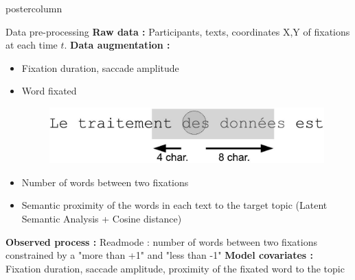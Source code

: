 \documentclass[final,hyperref={pdfpagelabels=false}]{beamer}
\begin{document}
\begin{frame}
\begin{columns}
\begin{column}{.50\textwidth}
\begin{beamercolorbox}[center,wd=\textwidth]{postercolumn}
\begin{minipage}[T]{.98\textwidth}
{            \vfill
            \begin{block}{Data pre-processing}
                \textbf{Raw data :} Participants, texts, coordinates X,Y of fixations at each time $t$.
                \vskip0.5cm
                \textbf{Data augmentation :}
                \begin{itemize}
                    \item[\bullet] Fixation duration, saccade amplitude
                    \item[\bullet]
                    \begin{minipage}{0.45\textwidth}
                        Word fixated
                    \end{minipage}
                    \begin{minipage}{0.35\textwidth}
                        \begin{figure}[H]
                            \includegraphics[width=1\linewidth]{fixation_window.jpg}
                        \end{figure}
                    \end{minipage}
                    \item[\bullet] Number of words between two fixations
                    \item[\bullet] Semantic proximity of the words in each text to the target topic (Latent Semantic Analysis + Cosine distance)
                \end{itemize}
                \vskip0.5cm
                \textbf{Observed process :} Readmode :  number of words between two fixations constrained by a "more than +1" and "less than -1"
                \vskip0.5cm
                \textbf{Model covariates :} Fixation duration, saccade amplitude, proximity of the fixated word to the topic


\end{block}}
\end{minipage}
\end{beamercolorbox}
\end{column}
\end{columns}
\end{frame}
\end{document}
